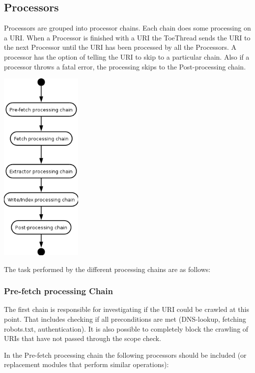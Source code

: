 \documentclass[11pt,a4paper]{article}
\begin{document}
\subsection{Processors}
Processors are grouped into processor chains. Each chain does some processing on a URI. When a Processor is finished with a URI the ToeThread sends the URI to the next Processor until the URI has been processed by all the Processors. A processor has the option of telling the URI to skip to a particular chain. Also if a processor throws a fatal error, the processing skips to the Post-processing chain.

\begin{center}
\includegraphics[width=40mm]{processing_steps.png}
\end{center}

The task performed by the different processing chains are as follows:

\subsubsection{Pre-fetch processing Chain}
The first chain is responsible for investigating if the URI could be crawled at this point. That includes checking if all preconditions are met (DNS-lookup, fetching robots.txt, authentication). It is also possible to completely block the crawling of URIs that have not passed through the scope check.

In the Pre-fetch processing chain the following processors should be included (or replacement modules that perform similar operations):
\end{document}
